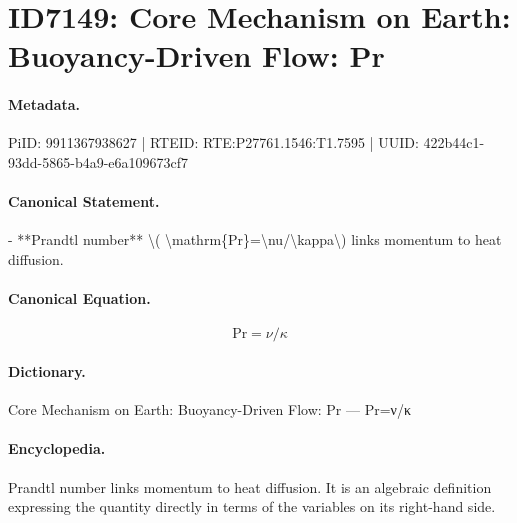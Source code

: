 \section*{ID7149: Core Mechanism on Earth: Buoyancy-Driven Flow: Pr}
\paragraph{Metadata.}
PiID: 9911367938627 | RTEID: RTE:P27761.1546:T1.7595 | UUID: 422b44c1-93dd-5865-b4a9-e6a109673cf7

\paragraph{Canonical Statement.}
- **Prandtl number** \textbackslash{}( \textbackslash{}mathrm\{Pr\}=\textbackslash{}nu/\textbackslash{}kappa\textbackslash{}) links momentum to heat diffusion.

\paragraph{Canonical Equation.}
\[
\mathrm{Pr}=\nu/\kappa
\]

\paragraph{Dictionary.}
Core Mechanism on Earth: Buoyancy-Driven Flow: Pr — Pr=ν/κ

\paragraph{Encyclopedia.}
Prandtl number links momentum to heat diffusion. It is an algebraic definition expressing the quantity directly in terms of the variables on its right-hand side.

